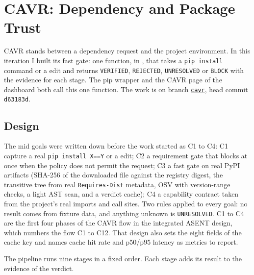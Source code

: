 ﻿%
\section{CAVR: Dependency and Package Trust}\label{sec:cavr}
\begin{sloppypar}
CAVR stands between a dependency request and the project environment. In this iteration I built its fast gate: one function,  in , that takes a \texttt{pip install} command or a  edit and returns \texttt{VERIFIED}, \texttt{REJECTED}, \texttt{UNRESOLVED} or \texttt{BLOCK} with the evidence for each stage. The pip wrapper and the CAVR page of the dashboard both call this one function. The work is on branch \href{https://github.com/SheharyarAli-Dev/Working-POC/tree/cavr}{\texttt{cavr}}, head commit \texttt{d63183d}.
\end{sloppypar}

\subsection{Design}
\begin{sloppypar}
The mid goals were written down before the work started as C1 to C4: C1 capture a real \texttt{pip install X==Y} or a  edit; C2 a requirement gate that blocks at once when the policy does not permit the request; C3 a fast gate on real PyPI artifacts (SHA-256 of the downloaded file against the registry digest, the transitive tree from real \texttt{Requires-Dist} metadata, OSV with version-range checks, a light AST scan, and a verdict cache); C4 a capability contract taken from the project's real imports and call sites. Two rules applied to every goal: no result comes from fixture data, and anything unknown is \texttt{UNRESOLVED}. C1 to C4 are the first four phases of the CAVR flow in the integrated ASENT design, which numbers the flow C1 to C12. That design also sets the eight fields of the cache key and names cache hit rate and p50/p95 latency as metrics to report.
\end{sloppypar}

The pipeline runs nine stages in a fixed order. Each stage adds its result to the evidence of the verdict.

